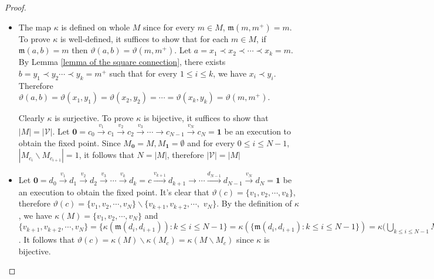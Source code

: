 \documentclass{article}
\theoremstyle{definition}
\newcommand\successor[1]{{#1}^{+}}
\newcommand\set[1]{\{ #1 \}}
\newcommand\labelmap[1]{\mathfrak{m}(#1)}
\begin{document}
\begin{proof}$\text{ }$\\
\begin{itemize}
\item[1. ] The map $\kappa$ is defined on whole $M$ since for every $m\in M$, $\mathfrak{m}(m,m^{+})=m$. To prove $\kappa$ is well-defined, it suffices to show that for each $m\in M$, if $\labelmap{a,b}=m$ then $\vartheta(a,b)=\vartheta(m,m^{+})$.  Let $a=x_1 \prec x_2 \prec \cdots \prec x_k=m$. By Lemma \ref{lemma of the square connection}, there exists $b=y_1 \prec y_2 \cdots \prec y_k=\successor{m}$ such that for every $1 \leq i \leq k$, we have $ x_i \prec y_i$. Therefore $\vartheta (a,b)=\vartheta (x_1,y_1)=\vartheta (x_2,y_2)=\cdots=\vartheta (x_k,y_k)=\vartheta (m,\successor{m})$.

\hspace{3.ex} Clearly $\kappa$ is surjective. To prove $\kappa$ is bijective, it suffices to show that $|M|=|\mathcal{V}|$. Let $\textbf{0}=c_0\overset{v_1}{\to}c_1 \overset{v_2}{\to}c_2\overset{v_3}{\to}\cdots \to c_{N-1}\overset{v_N}{\to}c_N=\textbf{1}$ be an execution to obtain the fixed point. Since $M_\textbf{0}=M,M_\textbf{1}=\emptyset$ and for every $0 \leq i \leq N-1$, $|M_{c_i}\backslash M_{c_{i+1}} |=1$, it follows that $N=|M|$, therefore $|\mathcal{V}|=|M|$
\item[2. ] Let $\textbf{0}=d_0\overset{v_1}{\to}d_1\overset{v_2}{\to}d_2\overset{v_3}{\to}\cdots\overset{v_k}{\to}d_k=c\overset{v_{k+1}}{\to}d_{k+1}\to\cdots \overset{d_{N-1}}{\to} d_{N-1}\overset{v_N}{\to}d_N=\textbf{1}$ be an execution to obtain the fixed point. It's clear that $\vartheta(c)=\set{v_1,v_2,\cdots,v_k}$, therefore $\vartheta(c)=\set{v_1,v_2,\cdots,v_N}\backslash \{v_{k+1},v_{k+2},\cdots,$ \linebreak $v_N\}$. By the definition of $\kappa$, we have $\kappa(M)=\set{v_1,v_2,\cdots,v_N}$ and $\{v_{k+1},v_{k+2},\cdots,v_N\}=\set{\kappa(\labelmap{d_i,d_{i+1}}):k \leq i \leq N-1}=\kappa(\set{\labelmap{d_i,d_{i+1}}: k \leq i\leq N-1})=\kappa\big(\underset{k \leq i \leq N-1}{\bigcup} M_{d_i}\backslash M_{d_{i+1}}\big)=\kappa(M_{d_{k}}\backslash M_{d_N})=\kappa(M_{d_{k}})=\kappa(M_c)$. It follows that $\vartheta(c)=\kappa(M)\backslash \kappa(M_c)=\kappa(M\backslash M_c)$ since $\kappa$ is bijective. 
\end{itemize}
\end{proof}
\end{document}
